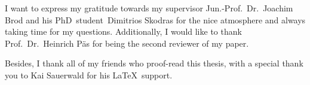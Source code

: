 I want to express my gratitude towards my supervisor Jun.-Prof.~Dr.~Joachim Brod and his PhD~student~Dimitrios Skodras for the nice atmosphere and always taking time for my questions. Additionally, I would like to thank Prof.~Dr.~Heinrich Päs for being the second reviewer of my paper.


Besides, I thank all of my friends who proof-read this thesis, with a special thank you to Kai Sauerwald for his \LaTeX\ support.
